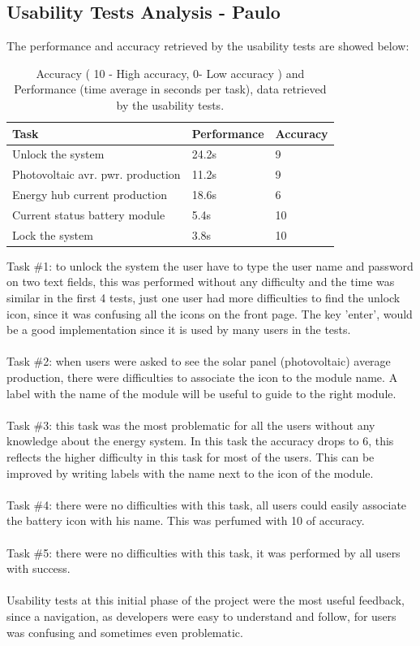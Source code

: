 \subsection{Usability Tests Analysis - Paulo}

The performance and accuracy retrieved by the usability tests are showed below:\\
	
\begin{table}[H]
\begin{tabular}{ | l | l | l |}
	\hline
	Task 					      & 	Performance 	& 	Accuracy 		\\ \hline
	Unlock the system 			      & 	24.2s		& 	9			\\ \hline
	Photovoltaic avr. pwr. production   &		11.2s	    	& 	9			\\ \hline
	Energy hub current production 	      & 	18.6s		&	6 			\\ \hline
	Current status battery module 	      & 	5.4s			& 	10			\\ \hline
	Lock the system 			      & 	3.8s			& 	10			\\ \hline
\end{tabular}
\caption{Accuracy ( 10 - High accuracy, 0- Low accuracy ) and Performance (time average in seconds per task), data retrieved by the usability tests.}
\end{table}

\noindent Task \#1: to unlock the system the user have to type the user name and password on two text fields, this was performed without any difficulty and the time was similar in the first 4 tests, just one user had more difficulties to find  the unlock icon, since it was confusing all the icons on the front page. The key 'enter', would be a good implementation since it is used by many users in the tests.\\
\\
Task \#2: when users were asked to see the solar panel (photovoltaic) average production, there were difficulties to associate the icon to the module name. A label with the name of the module will be useful to guide to the right module.\\
\\
Task \#3: this task was the most problematic for all the users without any knowledge about the energy system. In this task the accuracy drops to 6, this reflects the higher difficulty in this task for most of the users. This can be improved by writing labels with the name next to the icon of the module.\\
\\
Task \#4: there were no difficulties with this task, all users could easily associate the battery icon with his name. This was perfumed with 10 of accuracy.\\
\\
Task \#5: there were no difficulties with this task, it was performed by all users with success.\\
\\
Usability tests at this initial phase of the project were the most useful feedback, since a navigation, as developers were easy to understand and follow, for users was confusing and sometimes even problematic.

